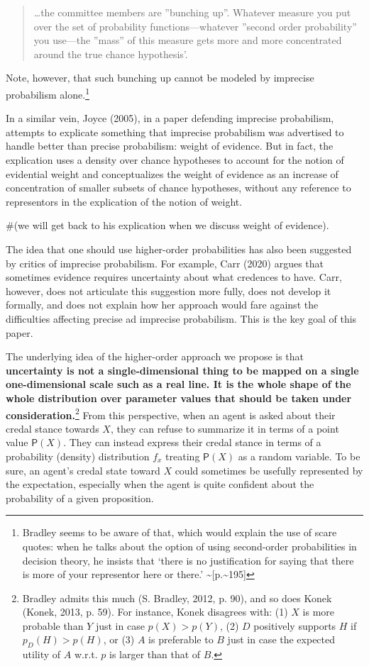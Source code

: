 \documentclass[
  10pt,
  dvipsnames,enabledeprecatedfontcommands]{scrartcl}
\begin{document}
\begin{quote}
\dots the committee members are ''bunching up''. Whatever measure you put over the set of probability functions---whatever ''second order probability'' you use---the ''mass'' of this measure gets more and more concentrated around the true chance hypothesis'.
\end{quote}

\noindent Note, however, that such bunching up cannot be modeled by
imprecise probabilism alone.\footnote{Bradley seems to be aware of that,
  which would explain the use of scare quotes: when he talks about the
  option of using second-order probabilities in decision theory, he
  insists that `there is no justification for saying that there is more
  of your representor here or there.'
  \textasciitilde{[}p.\textasciitilde195{]}}

In a similar vein, Joyce (2005), in a paper defending imprecise
probabilism, attempts to explicate something that imprecise probabilism
was advertised to handle better than precise probabilism: weight of
evidence. But in fact, the explication uses a density over chance
hypotheses to account for the notion of evidential weight and
conceptualizes the weight of evidence as an increase of concentration of
smaller subsets of chance hypotheses, without any reference to
representors in the explication of the notion of weight.

\#(we will get back to his explication when we discuss weight of
evidence).

The idea that one should use higher-order probabilities has also been
suggested by critics of imprecise probabilism. For example, Carr (2020)
argues that sometimes evidence requires uncertainty about what credences
to have. Carr, however, does not articulate this suggestion more fully,
does not develop it formally, and does not explain how her approach
would fare against the difficulties affecting precise ad imprecise
probabilism. This is the key goal of this paper.

The underlying idea of the higher-order approach we propose is that
\textbf{uncertainty is not a single-dimensional thing to be mapped on a
single one-dimensional scale such as a real line. It is the whole shape
of the whole distribution over parameter values that should be taken
under consideration.}\footnote{Bradley admits this much (S. Bradley,
  2012, p. 90), and so does Konek (Konek, 2013, p. 59). For instance,
  Konek disagrees with: (1) \(X\) is more probable than \(Y\) just in
  case \(p(X)>p(Y)\), (2) \(D\) positively supports \(H\) if
  \(p_D(H)> p(H)\), or (3) \(A\) is preferable to \(B\) just in case the
  expected utility of \(A\) w.r.t. \(p\) is larger than that of \(B\).}
From this perspective, when an agent is asked about their credal stance
towards \(X\), they can refuse to summarize it in terms of a point value
\(\mathsf{P}(X)\). They can instead express their credal stance in terms
of a probability (density) distribution \(f_x\) treating
\(\mathsf{P}(X)\) as a random variable. To be sure, an agent's credal
state toward \(X\) could sometimes be usefully represented by the
expectation, especially when the agent is quite confident about the
probability of a given proposition.
\end{document}
